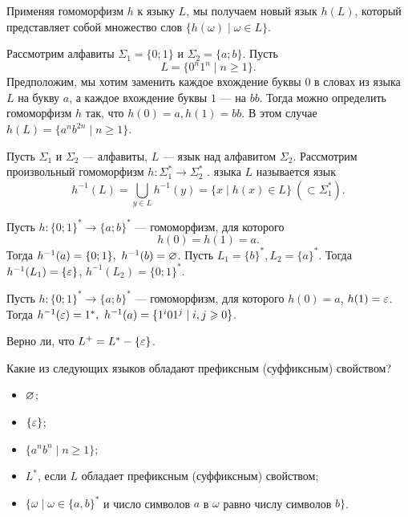 Применяя гомоморфизм $h$ к языку $L$, мы получаем новый язык $h(L)$, который представляет собой множество слов $\{h(\omega)\mid\omega\in L\}$.

\begin{myexample}
Рассмотрим алфавиты $\Sigma_1=\{0;1\}$ и $\Sigma_2=\{a;b\}$. Пусть
\[
    L=\{0^n1^n\mid n\ge1 \}.
\]
Предположим, мы хотим заменить каждое вхождение буквы $0$ в словах из языка $L$ на букву $a$, а каждое вхождение буквы $1$ --- на $bb$. Тогда можно определить гомоморфизм $h$ так, что $h(0)=a, h(1)=bb$. В этом случае $h(L)=\{a^nb^{2n}\mid n\ge1 \}$.
\end{myexample}

Пусть $\Sigma_1$ и $\Sigma_2$ --- алфавиты, $L$ --- язык над алфавитом $\Sigma_2$. Рассмотрим произвольный гомоморфизм $h\colon \Sigma_1^*\to\Sigma_2^*$ .  языка $L$ называется язык
\[h^{-1}(L) = \bigcup_{y\in L}h^{-1}(y) = \{x\mid h(x)\in L\}\  (\subset\Sigma_1^*).\]

\begin{myexample}
Пусть $h\colon \{0;1\}^*\to\{a;b\}^*$ --- гомоморфизм, для которого
\[h(0)=h(1)=a.\] Тогда $h^{-1}(a)=\{0;1\},~h^{-1}(b)=\varnothing$. Пусть
$L_1=\{b\}^*, L_2=\{a\}^*$. Тогда $h^{-1}(L_1)=\{\varepsilon\}$, $h^{-1}(L_2)=\{0;1\}^*$.
\end{myexample}

\begin{myexample}
Пусть $h\colon \{0;1\}^*\to\{a;b\}^*$ --- гомоморфизм, для которого
$h(0)=a$, $h(1)=\varepsilon$. Тогда $h^{-1}(\varepsilon)=1^*,~h^{-1}(a)=\{1^i01^j\mid i,j\geqslant0\}$.
\end{myexample}

\begin{myproblem}
Верно ли, что $L^+=L^*-\{\varepsilon\}$.
\end{myproblem}

\begin{myproblem}
Какие из следующих языков обладают префиксным (суффиксным) свойством?
\begin{itemize}
    \item $\varnothing$;
    \item $\{\varepsilon\}$;
    \item $\{a^nb^n\mid n\ge1 \}$;
    \item $L^*$, если $L$ обладает префиксным (суффиксным) свойством;
    \item $\{\omega\mid \omega\in\{a,b\}^*$ и число символов $a$ в $\omega$ равно числу символов $b\}$.
\end{itemize}
\end{myproblem}


